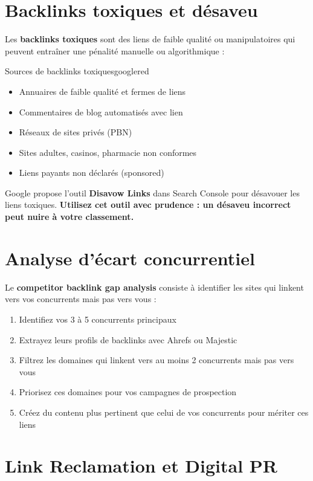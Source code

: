 \documentclass[12pt,a4paper,twoside]{report}
\newcommand{\keyword}[1]{\textbf{\textcolor{googleblue}{#1}}}
\newcommand{\important}[1]{\textbf{\textcolor{googlered}{#1}}}
\begin{document}
\section{Backlinks toxiques et désaveu}

Les \keyword{backlinks toxiques} sont des liens de faible qualité ou manipulatoires qui peuvent entraîner une pénalité manuelle ou algorithmique :

\begin{mybox}{Sources de backlinks toxiques}{googlered}
\begin{itemize}
    \item Annuaires de faible qualité et fermes de liens
    \item Commentaires de blog automatisés avec lien
    \item Réseaux de sites privés (PBN)
    \item Sites adultes, casinos, pharmacie non conformes
    \item Liens payants non déclarés (sponsored)
\end{itemize}
\end{mybox}

Google propose l'outil \keyword{Disavow Links} dans Search Console pour désavouer les liens toxiques. \important{Utilisez cet outil avec prudence : un désaveu incorrect peut nuire à votre classement.}

\section{Analyse d'écart concurrentiel}

Le \keyword{competitor backlink gap analysis} consiste à identifier les sites qui linkent vers vos concurrents mais pas vers vous :

\begin{enumerate}
    \item Identifiez vos 3 à 5 concurrents principaux
    \item Extrayez leurs profils de backlinks avec Ahrefs ou Majestic
    \item Filtrez les domaines qui linkent vers au moins 2 concurrents mais pas vers vous
    \item Priorisez ces domaines pour vos campagnes de prospection
    \item Créez du contenu plus pertinent que celui de vos concurrents pour mériter ces liens
\end{enumerate}

\section{Link Reclamation et Digital PR}
\end{document}
